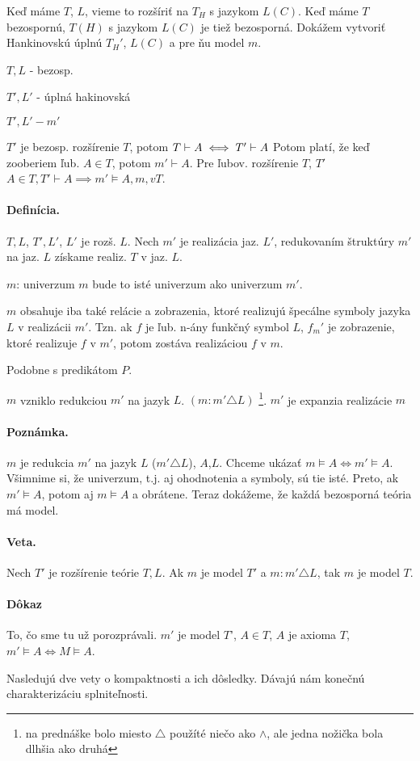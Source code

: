 \startFIXME

Keď máme $T$, $L$, vieme to rozšíriť na $T_H$ s jazykom $L(C)$. Keď máme $T$ bezospornú, $T(H)$ s jazykom $L(C)$ je tiež bezosporná. Dokážem vytvoriť Hankinovskú úplnú $T_H'$, $L(C)$ a pre ňu model $m$.

$T, L$ - bezosp.

$T', L'$ - úplná hakinovská

$T', L' - m'$

$T'$ je bezosp. rozšírenie $T$, potom $T \vdash A \iff T' \vdash A$ Potom platí, že keď zooberiem ľub. $A \in T$, potom  $m' \vdash A$. Pre ľubov. rozšírenie $T$, $T'$ $A\in T, T' \vdash A \implies m' \models A, m, v T$.

\paragraph{Definícia.}

$T,L$, $T',L'$, $L'$ je rozš. $L$. Nech $m'$ je realizácia jaz. $L'$, redukovaním štruktúry $m'$ na jaz. $L$ získame realiz. $T$ v jaz. $L$.

$m$: univerzum $m$ bude to isté univerzum ako univerzum $m'$.

$m$ obsahuje iba také relácie a zobrazenia, ktoré realizujú špecálne symboly jazyka $L$ v realizácii $m'$. Tzn. ak $f$ je ľub. n-ány funkčný symbol $L$, $f_m'$ je zobrazenie, ktoré realizuje $f$ v $m'$, potom zostáva realizáciou $f$ v $m$.

Podobne s predikátom $P$.

$m$ vzniklo redukciou $m'$ na jazyk $L$. $(m: m' \triangle L)$
\footnote{na prednáške bolo miesto $\triangle$ použíté niečo ako $\land$, ale jedna nožička bola dlhšia ako druhá}.
$m'$ je expanzia realizácie $m$

\paragraph{Poznámka.}
$m$ je redukcia $m'$ na jazyk $L$ ($m'\triangle L$), $A$,$L$. Chceme ukázať $m \models A \iff m' \models A$. Všimnime si, že univerzum, t.j. aj ohodnotenia a symboly, sú tie isté. Preto, ak $m' \models A$, potom aj $m \models A$ a obrátene. Teraz dokážeme, že každá bezosporná teória má model.

\paragraph{Veta.}
Nech $T'$ je rozšírenie teórie $T, L$. Ak $m$ je model $T'$ a $m:m'\triangle L$, tak $m$ je model $T$.

\paragraph{Dôkaz} To, čo sme tu už porozprávali. $m'$ je model $T$',
$A \in T$, $A$ je axioma $T$, $m' \models A \iff M \models A$.

Nasledujú dve vety o kompaktnosti a ich dôsledky. Dávajú nám konečnú charakterizáciu splniteľnosti.

\stopFIXME
